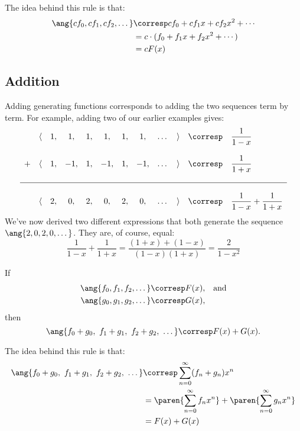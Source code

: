 The idea behind this rule is that:
\begin{align*}
\ang{c f_0, c f_1, c f_2, \dots}
    & \corresp c f_0 + c f_1 x + c f_2 x^2 + \cdots \\
    & = c \cdot (f_0 + f_1 x + f_2 x^2 + \cdots) \\
    & = c F(x)
\end{align*}

\subsection{Addition}

Adding generating functions corresponds to adding the two sequences
term by term.  For example, adding two of our earlier examples gives:
%
\[
\begin{array}{cccccccccccl}
  & \langle & 1, & 1, & 1, & 1, & 1, & 1, & \dots & \rangle &
    \corresp & \dfrac{1}{1-x} \\
\\
+ & \langle & 1, & -1, & 1, & -1, & 1, & -1, & \dots & \rangle &
    \corresp & \dfrac{1}{1+x} \\
\\
\hline
\\
& \langle & 2, & 0, & 2, & 0, & 2, & 0, & \dots & \rangle &
    \corresp & \dfrac{1}{1-x} + \dfrac{1}{1+x}
\end{array}
\]
%
We've now derived two different expressions that both generate the
sequence $\ang{2, 0, 2, 0, \dots}$.  They are, of course, equal:
%
\[
\frac{1}{1-x} + \frac{1}{1+x} = \frac{(1 + x) + (1 - x)}{(1-x)(1+x)} = \frac{2}{1-x^2}
\]

\begin{mathrule}
\label{rule:addition}
If
%
\begin{align*}
\ang{f_0, f_1, f_2, \dots} & \corresp F(x), & \text{and} \\
\ang{g_0, g_1, g_2, \dots} & \corresp G(x),
\end{align*}
%
then
%
\[
\ang{f_0 + g_0,\ f_1 + g_1,\ f_2 + g_2,\ \dots}
    \corresp F(x) + G(x).
\]
\end{mathrule}

The idea behind this rule is that:
\begin{align*}
\ang{f_0 + g_0,\ f_1 + g_1,\ f_2 + g_2,\ \dots}
    & \corresp \sum_{n=0}^\infty (f_n + g_n) x^n \\
    & = \paren{\sum_{n=0}^\infty f_n x^n} +
        \paren{\sum_{n=0}^\infty g_n x^n} \\
    & = F(x) + G(x)
\end{align*}

